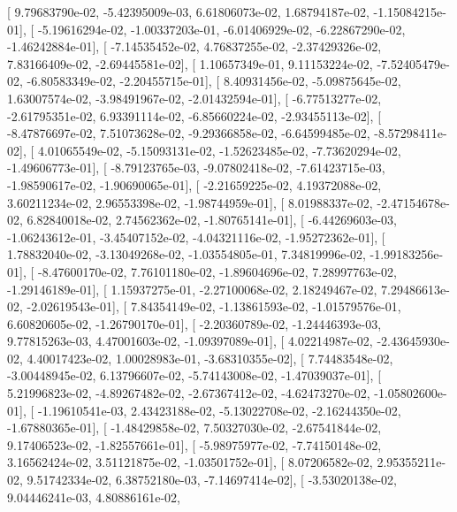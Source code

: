 \documentclass{article}
\begin{document}
       [  9.79683790e-02,  -5.42395009e-03,   6.61806073e-02,
          1.68794187e-02,  -1.15084215e-01],
       [ -5.19616294e-02,  -1.00337203e-01,  -6.01406929e-02,
         -6.22867290e-02,  -1.46242884e-01],
       [ -7.14535452e-02,   4.76837255e-02,  -2.37429326e-02,
          7.83166409e-02,  -2.69445581e-02],
       [  1.10657349e-01,   9.11153224e-02,  -7.52405479e-02,
         -6.80583349e-02,  -2.20455715e-01],
       [  8.40931456e-02,  -5.09875645e-02,   1.63007574e-02,
         -3.98491967e-02,  -2.01432594e-01],
       [ -6.77513277e-02,  -2.61795351e-02,   6.93391114e-02,
         -6.85660224e-02,  -2.93455113e-02],
       [ -8.47876697e-02,   7.51073628e-02,  -9.29366858e-02,
         -6.64599485e-02,  -8.57298411e-02],
       [  4.01065549e-02,  -5.15093131e-02,  -1.52623485e-02,
         -7.73620294e-02,  -1.49606773e-01],
       [ -8.79123765e-03,  -9.07802418e-02,  -7.61423715e-03,
         -1.98590617e-02,  -1.90690065e-01],
       [ -2.21659225e-02,   4.19372088e-02,   3.60211234e-02,
          2.96553398e-02,  -1.98744959e-01],
       [  8.01988337e-02,  -2.47154678e-02,   6.82840018e-02,
          2.74562362e-02,  -1.80765141e-01],
       [ -6.44269603e-03,  -1.06243612e-01,  -3.45407152e-02,
         -4.04321116e-02,  -1.95272362e-01],
       [  1.78832040e-02,  -3.13049268e-02,  -1.03554805e-01,
          7.34819996e-02,  -1.99183256e-01],
       [ -8.47600170e-02,   7.76101180e-02,  -1.89604696e-02,
          7.28997763e-02,  -1.29146189e-01],
       [  1.15937275e-01,  -2.27100068e-02,   2.18249467e-02,
          7.29486613e-02,  -2.02619543e-01],
       [  7.84354149e-02,  -1.13861593e-02,  -1.01579576e-01,
          6.60820605e-02,  -1.26790170e-01],
       [ -2.20360789e-02,  -1.24446393e-03,   9.77815263e-03,
          4.47001603e-02,  -1.09397089e-01],
       [  4.02214987e-02,  -2.43645930e-02,   4.40017423e-02,
          1.00028983e-01,  -3.68310355e-02],
       [  7.74483548e-02,  -3.00448945e-02,   6.13796607e-02,
         -5.74143008e-02,  -1.47039037e-01],
       [  5.21996823e-02,  -4.89267482e-02,  -2.67367412e-02,
         -4.62473270e-02,  -1.05802600e-01],
       [ -1.19610541e-03,   2.43423188e-02,  -5.13022708e-02,
         -2.16244350e-02,  -1.67880365e-01],
       [ -1.48429858e-02,   7.50327030e-02,  -2.67541844e-02,
          9.17406523e-02,  -1.82557661e-01],
       [ -5.98975977e-02,  -7.74150148e-02,   3.16562424e-02,
          3.51121875e-02,  -1.03501752e-01],
       [  8.07206582e-02,   2.95355211e-02,   9.51742334e-02,
          6.38752180e-03,  -7.14697414e-02],
       [ -3.53020138e-02,   9.04446241e-03,   4.80886161e-02,
\end{document}
